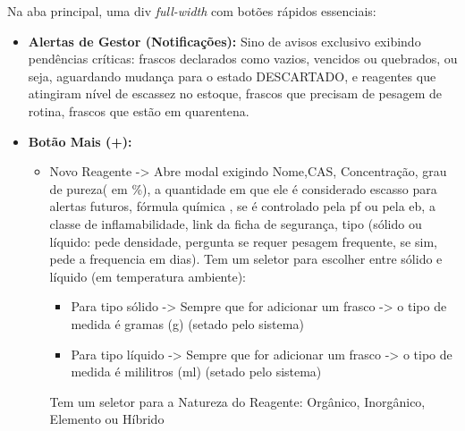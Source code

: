 \documentclass[12pt,a4paper]{article}
\begin{document}
Na aba principal, uma div \textit{full-width} com botões rápidos essenciais:
\begin{itemize}
    \item \textbf{Alertas de Gestor (Notificações):} Sino de avisos exclusivo exibindo pendências críticas: frascos declarados como vazios, vencidos ou quebrados, ou seja, aguardando mudança para o estado DESCARTADO, e reagentes que atingiram nível de escassez no estoque, frascos que precisam de pesagem de rotina, frascos que estão em quarentena.
    \item \textbf{Botão Mais (+):}
    \begin{itemize}
        \item Novo Reagente -> Abre modal exigindo Nome,CAS, Concentração, grau de pureza( em \%), a quantidade em que ele é considerado escasso para alertas futuros, fórmula química , se é controlado pela pf ou pela eb, a classe de inflamabilidade, link da ficha de segurança, tipo (sólido ou líquido: pede densidade, pergunta se requer pesagem frequente, se sim, pede a frequencia em dias). 
        Tem um seletor para escolher entre sólido e líquido (em temperatura ambiente):
        \begin{itemize}
            \item Para tipo sólido -> Sempre que for adicionar um frasco -> o tipo de medida é gramas (g) (setado pelo sistema)
            \item Para tipo líquido -> Sempre que for adicionar um frasco -> o tipo de medida é mililitros (ml) (setado pelo sistema)
        \end{itemize}
        Tem um seletor para a Natureza do Reagente: Orgânico, Inorgânico, Elemento ou Híbrido
        

\end{itemize}
\end{itemize}
\end{document}
